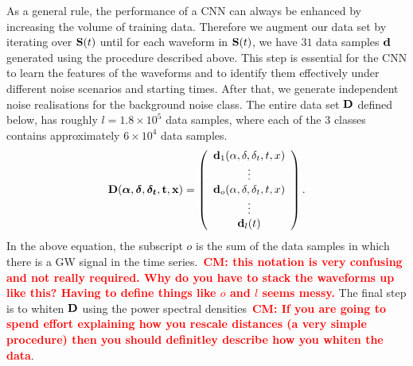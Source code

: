 \documentclass[aps,twocolumn,showpacs,groupedaddress, nofootinbib]{revtex4}  %
\newcommand{\cm}[1]{\textbf{\textcolor{red}{CM: #1}}}
\begin{document}
%
%
As a general rule, the performance of a \ac{CNN} can always be enhanced by
increasing the volume of training data. Therefore we augment our data set by
iterating over $\bold{S}(t)$ until for each waveform in $\bold{S}(t)$, we have
$31$ data samples $\bold{d}$ generated using the procedure described above.
This step is essential for the \ac{CNN} to learn the features of the waveforms
and to identify them effectively under different noise scenarios and starting
times.  After that, we generate independent noise realisations for the
background noise class. The entire data set $\bold{D}$ defined below, has
roughly $l = 1.8 \times 10^{5}$ data samples, where each of the 3 classes
contains approximately $6\times10^{4}$ data samples.
%
\begin{equation}\label{eq:finaldata}
\bold{D}(\boldsymbol{\alpha}, \boldsymbol{\delta}, \boldsymbol{\delta_t}, \bold{t}, \bold{x}) =  \left(\begin{array}{c}
\bold{d}_1(\alpha, \delta, \delta_t, t, x) \\
\vdots \\
\bold{d}_o(\alpha, \delta, \delta_t, t, x) \\
\vdots \\
\bold{d}_l(t) \\
\end{array}\right).
\end{equation}
%
In the above equation, the subscript $o$ is the sum of the data samples in
which there is a \ac{GW} signal in the time series.~\cm{this notation is very
confusing and not really required. Why do you have to stack the waveforms up
like this? Having to define things like $o$ and $l$ seems messy.} The final
step is to whiten $\bold{D}$ using the power spectral densities~\cm{If you are
going to spend effort explaining how you rescale distances (a very simple
procedure) then you should definitley describe how you whiten the data}. 
\end{document}
